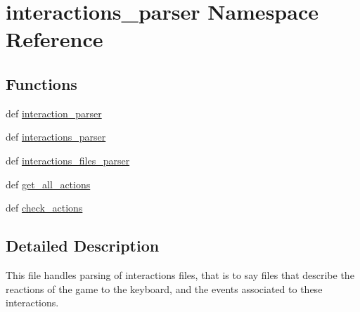 \hypertarget{namespaceinteractions__parser}{\section{interactions\-\_\-parser \-Namespace \-Reference}
\label{namespaceinteractions__parser}
}
\subsection*{\-Functions}
\begin{DoxyCompactItemize}
\item 
def \hyperlink{namespaceinteractions__parser_a8f778a5d9141c713ca41acb1c1b90835}{interaction\-\_\-parser}
\item 
def \hyperlink{namespaceinteractions__parser_ad537386722b63ae29201f5991d122184}{interactions\-\_\-parser}
\item 
def \hyperlink{namespaceinteractions__parser_a1078a4447bd4b2c8a742aa841a24e719}{interactions\-\_\-files\-\_\-parser}
\item 
def \hyperlink{namespaceinteractions__parser_aed4227ed27b278c34109f52170f73eff}{get\-\_\-all\-\_\-actions}
\item 
def \hyperlink{namespaceinteractions__parser_ad69efea6786216560c7faa109ac41bcc}{check\-\_\-actions}
\end{DoxyCompactItemize}


\subsection{\-Detailed \-Description}
\begin{DoxyVerb}
This file handles parsing of interactions files, that is to say files that
describe the reactions of the game to the keyboard, and the events associated to
these interactions.
\end{DoxyVerb}
 

